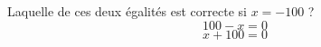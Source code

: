 
\begin{mental}
    Laquelle de ces deux égalités est correcte si \( x=-100\) ?
\begin{equation}
    100-x=0
\end{equation}
\begin{equation}
    x+100=0
\end{equation}
\end{mental}

